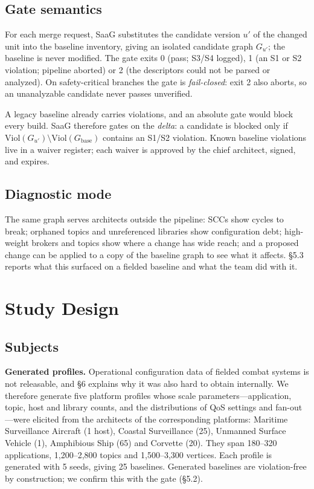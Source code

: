 \documentclass[sigconf,screen]{acmart}
\begin{document}
\subsection{Gate semantics}
For each merge request, SaaG substitutes the candidate version $u'$ of the changed unit into the baseline inventory, giving an isolated candidate graph $G_{u'}$; the baseline is never modified. The gate exits 0 (pass; S3/S4 logged), 1 (an S1 or S2 violation; pipeline aborted) or 2 (the descriptors could not be parsed or analyzed). On safety-critical branches the gate is \emph{fail-closed}: exit 2 also aborts, so an unanalyzable candidate never passes unverified.

A legacy baseline already carries violations, and an absolute gate would block every build. SaaG therefore gates on the \emph{delta}: a candidate is blocked only if $\mathrm{Viol}(G_{u'})\setminus\mathrm{Viol}(G_{\mathrm{base}})$ contains an S1/S2 violation. Known baseline violations live in a waiver register; each waiver is approved by the chief architect, signed, and expires.

\subsection{Diagnostic mode}
The same graph serves architects outside the pipeline: SCCs show cycles to break; orphaned topics and unreferenced libraries show configuration debt; high-weight brokers and topics show where a change has wide reach; and a proposed change can be applied to a copy of the baseline graph to see what it affects. \S5.3 reports what this surfaced on a fielded baseline and what the team did with it.

\section{Study Design}

\subsection{Subjects}
\noindent\textbf{Generated profiles.} Operational configuration data of fielded combat systems is not releasable, and \S6 explains why it was also hard to obtain internally. We therefore generate five platform profiles whose scale parameters---application, topic, host and library counts, and the distributions of QoS settings and fan-out---were elicited from the architects of the corresponding platforms: Maritime Surveillance Aircraft (1 host), Coastal Surveillance (25), Unmanned Surface Vehicle (1), Amphibious Ship (65) and Corvette (20). They span 180--320 applications, 1{,}200--2{,}800 topics and 1{,}500--3{,}300 vertices. Each profile is generated with 5 seeds, giving 25 baselines. Generated baselines are violation-free by construction; we confirm this with the gate (\S5.2).
\end{document}

